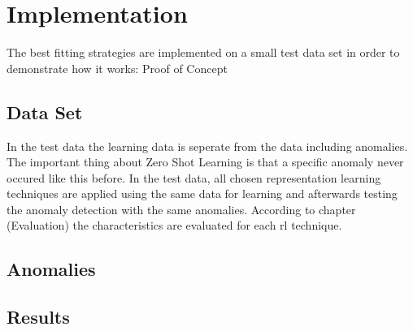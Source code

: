 \chapter{Implementation}
The best fitting strategies are implemented on a small test data set in order to demonstrate how it works: Proof of Concept\\
\section{Data Set}
In the test data the learning data is seperate from the data including anomalies. The important thing about Zero Shot Learning is that a specific anomaly never occured like this before. In the test data, all chosen representation learning techniques are applied using the same data for learning and afterwards testing the anomaly detection with the same anomalies. According to chapter (Evaluation) the characteristics are evaluated for each rl technique.\\
\section{Anomalies}
\section{Results}
